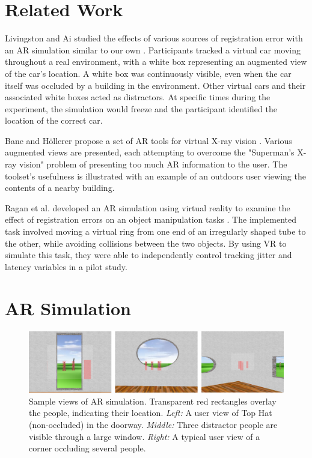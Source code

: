 \documentclass{acmsiggraph}                     %
\begin{document}
\section{Related Work}

Livingston and Ai studied the effects of various sources of registration error with an AR simulation similar to our own \cite{4637329}.  Participants tracked a virtual car moving throughout a real environment, with a white box representing an augmented view of the car's location.  A white box was continuously visible, even when the car itself was occluded by a building in the environment.  Other virtual cars and their associated white boxes acted as distractors.  At specific times during the experiment, the simulation would freeze and the participant identified the location of the correct car.

Bane and H\"{o}llerer propose a set of AR tools for virtual X-ray vision \cite{1383060}.  Various augmented views are presented, each attempting to overcome the "Superman's X-ray vision" problem of presenting too much AR information to the user.  The toolset's usefulness is illustrated with an example of an outdoors user viewing the contents of a nearby building.

Ragan et al. developed an AR simulation using virtual reality to examine the effect of registration errors on an object manipulation tasks \cite{4811058}.  The implemented task involved moving a virtual ring from one end of an irregularly shaped tube to the other, while avoiding collisions between the two objects.  By using VR to simulate this task, they were able to independently control tracking jitter and latency variables in a pilot study.



\section{AR Simulation}

\begin{figure}[ht!]
	\centering
	\includegraphics[width=5in]{figures/triple_view.png}
	\caption{Sample views of AR simulation.  Transparent red rectangles overlay the people, indicating their location.  \emph{Left:} A user view of Top Hat (non-occluded) in the doorway.   \emph{Middle:} Three distractor people are visible through a large window.  \emph{Right:} A typical user view of a corner occluding several people.}
\end{figure}
\end{document}
